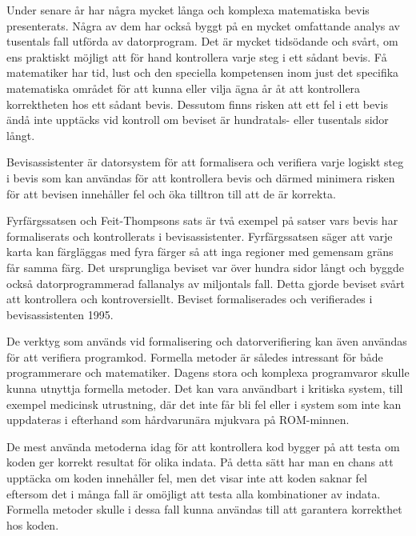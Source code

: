Under senare år har några mycket långa och komplexa matematiska bevis
presenterats. Några av dem har också byggt på en mycket omfattande analys av
tusentals fall utförda av datorprogram. Det är mycket tidsödande och svårt, om
ens praktiskt möjligt att för hand kontrollera varje steg i ett sådant bevis.
Få matematiker har tid, lust och den speciella kompetensen inom just det
specifika matematiska området för att kunna eller vilja ägna år åt att
kontrollera korrektheten hos ett sådant bevis. Dessutom finns risken att ett
fel i ett bevis ändå inte upptäcks vid kontroll om beviset är hundratals- eller
tusentals sidor långt\cite{harrison2008formal}.

Bevisassistenter är datorsystem för att formalisera och verifiera varje logiskt
steg i bevis som kan användas för att kontrollera bevis och därmed minimera
risken för att bevisen innehåller fel och öka tilltron till att de är korrekta.

Fyrfärgssatsen\cite{gonthier2008formal} och Feit-Thompsons
sats\cite{aschbacher2004status} är två exempel på satser vars bevis har
formaliserats och kontrollerats i bevisassistenter. Fyrfärgssatsen säger att
varje karta kan färgläggas med fyra färger så att inga regioner med gemensam
gräns får samma färg. Det ursprungliga beviset var över hundra sidor långt och
byggde också datorprogrammerad fallanalys av miljontals fall. Detta gjorde
beviset svårt att kontrollera och kontroversiellt. Beviset formaliserades och
verifierades i bevisassistenten \coq{} 1995.

De verktyg som används vid formalisering och datorverifiering kan även användas
för att verifiera programkod. Formella metoder är således intressant för både
programmerare och matematiker. Dagens stora och komplexa programvaror skulle
kunna utnyttja formella metoder. Det kan vara användbart i kritiska system,
till exempel medicinsk utrustning, där det inte får bli fel eller i system som
inte kan uppdateras i efterhand som hårdvarunära mjukvara på ROM-minnen.

De mest använda metoderna idag för att kontrollera kod bygger på att testa om
koden ger korrekt resultat för olika indata. På detta sätt har man en chans att
upptäcka om koden innehåller fel, men det visar inte att koden saknar fel
eftersom det i många fall är omöjligt att testa alla kombinationer av indata.
Formella metoder skulle i dessa fall kunna användas till att garantera
korrekthet hos koden.

